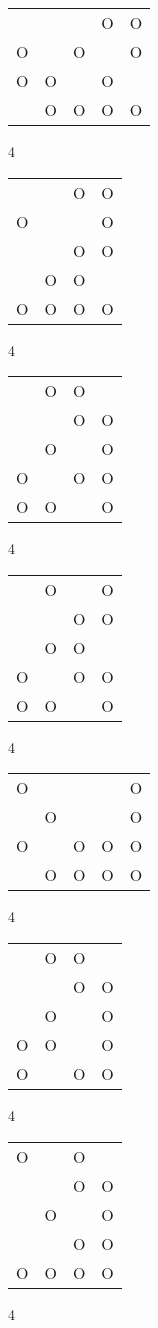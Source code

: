 \begin{tabular}{|m{0.2cm}m{0.2cm}m{0.2cm}m{0.2cm}m{0.2cm}|}\hline
 & & &O&O\\
O& &O& &O\\
O&O& &O& \\
 &O&O&O&O\\
\hline\end{tabular}4
\begin{tabular}{|m{0.2cm}m{0.2cm}m{0.2cm}m{0.2cm}|}\hline
 & &O&O\\
O& & &O\\
 & &O&O\\
 &O&O& \\
O&O&O&O\\
\hline\end{tabular}4
\begin{tabular}{|m{0.2cm}m{0.2cm}m{0.2cm}m{0.2cm}|}\hline
 &O&O& \\
 & &O&O\\
 &O& &O\\
O& &O&O\\
O&O& &O\\
\hline\end{tabular}4
\begin{tabular}{|m{0.2cm}m{0.2cm}m{0.2cm}m{0.2cm}|}\hline
 &O& &O\\
 & &O&O\\
 &O&O& \\
O& &O&O\\
O&O& &O\\
\hline\end{tabular}4
\begin{tabular}{|m{0.2cm}m{0.2cm}m{0.2cm}m{0.2cm}m{0.2cm}|}\hline
O& & & &O\\
 &O& & &O\\
O& &O&O&O\\
 &O&O&O&O\\
\hline\end{tabular}4
\begin{tabular}{|m{0.2cm}m{0.2cm}m{0.2cm}m{0.2cm}|}\hline
 &O&O& \\
 & &O&O\\
 &O& &O\\
O&O& &O\\
O& &O&O\\
\hline\end{tabular}4
\begin{tabular}{|m{0.2cm}m{0.2cm}m{0.2cm}m{0.2cm}|}\hline
O& &O& \\
 & &O&O\\
 &O& &O\\
 & &O&O\\
O&O&O&O\\
\hline\end{tabular}4
